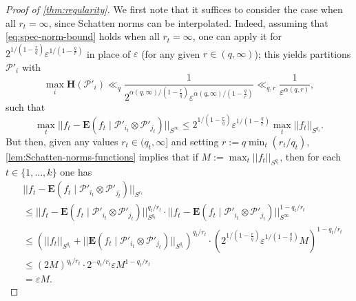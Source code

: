 \documentclass[reqno,11pt]{amsart}
\theoremstyle{definition}
\theoremstyle{remark}
\numberwithin{equation}{section}
\renewcommand{\H}{\mathbf{H}}
\newcommand{\E}{\mathbf{E}}
\newcommand{\mP}{\mathcal{P}}
\newcommand{\eps}{\varepsilon}
\begin{document}
\begin{proof}[Proof of \cref{thm:regularity}]
We first note that it suffices to consider the case when all $r_t = \infty$, since Schatten norms can be interpolated. Indeed, assuming that \cref{eq:spec-norm-bound} holds when all $r_t = \infty$, one can apply it for $2^{1/(1-\frac{r}{q})}\eps^{1/(1-\frac{q}{r})}$ in place of $\eps$ (for any given $r \in (q, \infty)$); this yields partitions $\mP'_i$ with
\[
    \max_i \H(\mP'_i) \ll_q \frac{1}{2^{\alpha(q,\infty)/(1-\frac{r}{q})}\eps^{\alpha(q,\infty)/(1 - \frac{q}{r})}}
    \ll_{q,r}
    \frac{1}{\eps^{\alpha(q,r)}},
\]
such that
\[
    \max_t ||f_t - \E(f_t \mid \mP'_{i_t} \otimes \mP'_{j_t})||_{S^\infty} \le 2^{1/(1-\frac{r}{q})} \eps^{1/(1-\frac{q}{r})} \max_t ||f_t||_{S^{q_t}}.
\]
But then, given any values $r_t \in (q_t, \infty]$ and setting $r := q \min_t(r_t/q_t)$, \cref{lem:Schatten-norms-functions} implies that if $M := \max_t ||f_t||_{S^{q_t}}$, then for each $t \in \{1, \ldots, k\}$ one has
\[
\begin{aligned}
    &||f_t - \E(f_t \mid \mP'_{i_t} \otimes \mP'_{j_t})||_{S^{r_t}} 
    \\
    &\le
    ||f_t - \E(f_t \mid \mP'_{i_t} \otimes \mP'_{j_t})||_{S^{q_t}}^{q_t/r_t} \cdot ||f_t - \E(f_t \mid \mP'_{i_t} \otimes \mP'_{j_t})||_{S^\infty}^{1 - q_t/r_t}
    \\
    &\le 
    \left(||f_t||_{S^{q_t}} + ||\E(f_t \mid \mP'_{i_t} \otimes \mP'_{j_t})||_{S^{q_t}}\right)^{q_t/r_t} \cdot \left(2^{1/(1-\frac{r}{q})}\eps^{1/(1-\frac{q}{r})} M\right)^{1 - q_t/r_t}
    \\
    &\le 
    \left(2M\right)^{q_t/r_t} \cdot 2^{-q_t/r_t}\eps M^{1 - q_t/r_t}
    \\
    &=
    \eps M.
\end{aligned}
\]



\end{proof}
\end{document}
